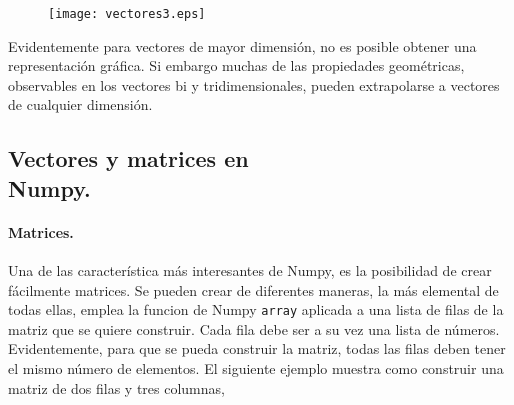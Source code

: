 \begin{figure}[h]
\centering
\texttt{[image: vectores3.eps]}
\label{fig:vectores3}
\end{figure}
\begin{paracol}{2}
Evidentemente para vectores de mayor dimensión, no es posible obtener una representación gráfica. Si embargo muchas de las propiedades geométricas, observables en los vectores bi y tridimensionales, pueden extrapolarse a vectores de cualquier dimensión.

\subsection{Vectores y matrices en\\ Numpy.}   
\paragraph{Matrices.} Una de las característica más interesantes de Numpy, es la posibilidad de crear fácilmente matrices. Se pueden crear de diferentes maneras, la más elemental de todas ellas, emplea la funcion de Numpy \texttt{array} aplicada a una lista de filas de la matriz que se quiere construir. Cada fila debe ser a su vez una lista de números. Evidentemente, para que se pueda construir la matriz, todas las filas deben tener el mismo número de elementos. El siguiente ejemplo muestra como construir una matriz de dos filas y tres columnas,
\end{paracol}

